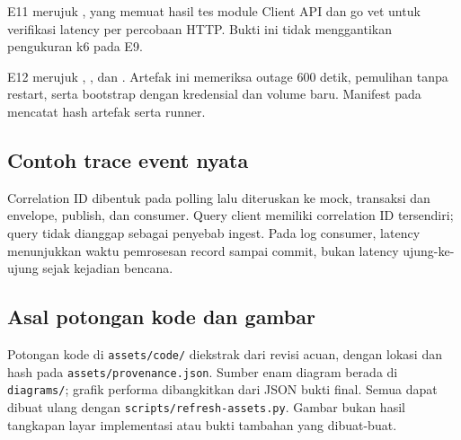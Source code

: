 E11 merujuk , yang memuat hasil tes module Client API dan go vet untuk verifikasi latency per percobaan HTTP. Bukti ini tidak menggantikan pengukuran k6 pada E9.

E12 merujuk , , dan . Artefak ini memeriksa outage 600 detik, pemulihan tanpa restart, serta bootstrap dengan kredensial dan volume baru. Manifest pada  mencatat hash artefak serta runner.

\subsection{Contoh trace event nyata}

Correlation ID dibentuk pada polling lalu diteruskan ke mock, transaksi dan envelope, publish, dan consumer. Query client memiliki correlation ID tersendiri; query tidak dianggap sebagai penyebab ingest. Pada log consumer, latency menunjukkan waktu pemrosesan record sampai commit, bukan latency ujung-ke-ujung sejak kejadian bencana.

\subsection{Asal potongan kode dan gambar}
Potongan kode di \nolinkurl{assets/code/} diekstrak dari revisi acuan, dengan lokasi dan hash pada \nolinkurl{assets/provenance.json}. Sumber enam diagram berada di \nolinkurl{diagrams/}; grafik performa dibangkitkan dari JSON bukti final. Semua dapat dibuat ulang dengan \nolinkurl{scripts/refresh-assets.py}. Gambar bukan hasil tangkapan layar implementasi atau bukti tambahan yang dibuat-buat.
